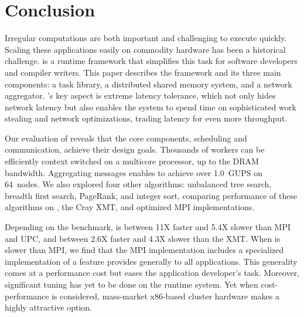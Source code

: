 \section{Conclusion}

Irregular computations are both important and challenging to execute
quickly.  Scaling these applications easily on commodity hardware has
been a historical challenge. \Grappa is a runtime framework that
simplifies this task for software developers and compiler
writers. This paper describes the \Grappa framework and its three main
components: a task library, a distributed shared memory system, and a
network aggregator. \Grappa's key aspect is extreme latency tolerance,
which not only hides network latency but also enables the system to
spend time on sophisticated work stealing and network optimizations,
trading latency for even more throughput.

Our evaluation of \Grappa reveals that the core components, scheduling
and communication, achieve their design goals.  Thousands of workers
can be efficiently context switched on a multicore processor, up to
the DRAM bandwidth.  Aggregating messages enables \Grappa to achieve
over 1.0~GUPS on 64~nodes.  We also explored four other algorithms:
unbalanced tree search, breadth first search, PageRank, and integer
sort, comparing performance of these algorithms on \Grappa, the Cray
XMT, and optimized MPI implementations.

Depending on the benchmark, \Grappa is between 11X faster and 5.4X
slower than MPI and UPC, and between 2.6X faster and 4.3X slower than
the XMT. When \Grappa is slower than MPI, we find that the MPI
implementation includes a specialized implementation of a feature
\Grappa provides generally to all applications. This generality comes
at a performance cost but eases the application developer's
task. Moreover, significant tuning has yet to be done on the \Grappa
runtime system.  Yet when cost-performance is considered, mass-market
x86-based cluster hardware makes \Grappa a highly attractive option.
